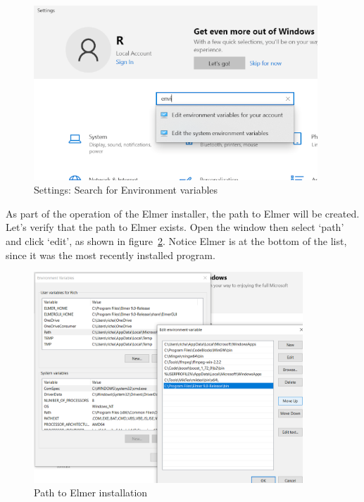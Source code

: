 \begin{figure}[H]
\begin{center}
\includegraphics[width=0.95\textwidth]{path-1}
\caption{Settings: Search for Environment variables}\label{fg:path-1}
\end{center}
\end{figure}

\newpage

As part of the operation of the Elmer installer, the path to Elmer will be created.  Let's verify that the path to Elmer exists.  Open the window then select `path' and click `edit', as shown in figure~\ref{fg:path-2}.   Notice Elmer is at the bottom of the list, since it was the most recently installed program.  

\begin{figure}[H]
\begin{center}
\includegraphics[width=0.9\textwidth]{path-2}
\caption{Path to Elmer installation}\label{fg:path-2}
\end{center}
\end{figure}

